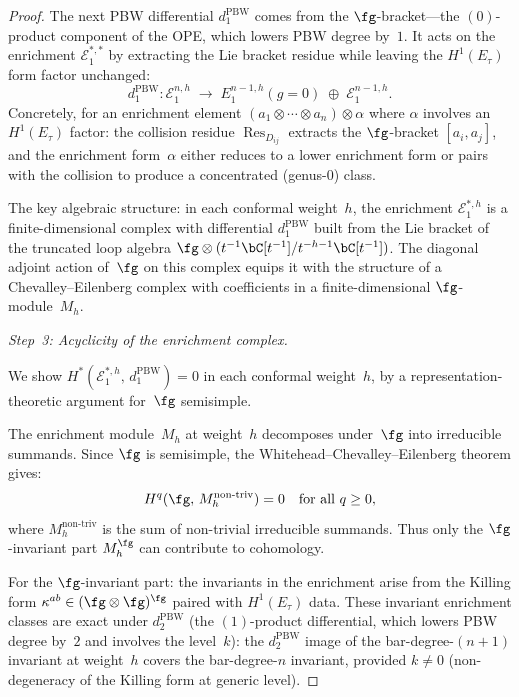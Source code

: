 \begin{proof}
The next PBW differential $d_1^{\mathrm{PBW}}$ comes
from the $\fg$-bracket---the $(0)$-product component
of the OPE, which lowers PBW degree by~$1$.  It acts
on the enrichment $\mathcal{E}^{*,*}_1$ by extracting
the Lie bracket residue while leaving the
$H^1(E_\tau)$ form factor unchanged:
\[
d_1^{\mathrm{PBW}}\colon \mathcal{E}_1^{n, h}
\;\longrightarrow\; E_1^{n-1,h}(g{=}0)
\;\oplus\; \mathcal{E}_1^{n-1, h}.
\]
Concretely, for an enrichment element
$(a_1 \otimes \cdots \otimes a_n) \otimes \alpha$
where $\alpha$ involves an $H^1(E_\tau)$ factor:
the collision residue $\operatorname{Res}_{D_{ij}}$
extracts the $\fg$-bracket $[a_i, a_j]$, and the
enrichment form~$\alpha$ either reduces to a lower
enrichment form or pairs with the collision to produce
a concentrated (genus-$0$) class.

The key algebraic structure: in each conformal
weight~$h$, the enrichment
$\mathcal{E}_1^{*,h}$ is a finite-dimensional complex
with differential $d_1^{\mathrm{PBW}}$ built from the
Lie bracket of the truncated loop algebra
$\fg \otimes (t^{-1}\bC[t^{-1}] / t^{-h-1}\bC[t^{-1}])$.
The diagonal adjoint action of~$\fg$ on this complex
equips it with the structure of a Chevalley--Eilenberg
complex with coefficients in a finite-dimensional
$\fg$-module~$M_h$.

\medskip
\emph{Step~3: Acyclicity of the enrichment complex.}

We show $H^*(\mathcal{E}_1^{*,h},\, d_1^{\mathrm{PBW}}) = 0$
in each conformal weight~$h$, by a representation-theoretic
argument for~$\fg$ semisimple.

The enrichment module~$M_h$ at weight~$h$ decomposes
under~$\fg$ into irreducible summands.  Since $\fg$ is
semisimple, the Whitehead--Chevalley--Eilenberg theorem
gives:
\[
H^q(\fg,\, M_h^{\mathrm{non\text{-}triv}}) = 0
\quad \text{for all } q \geq 0,
\]
where $M_h^{\mathrm{non\text{-}triv}}$ is the sum of
non-trivial irreducible summands.  Thus only the
$\fg$-invariant part $M_h^{\fg}$ can contribute
to cohomology.

For the $\fg$-invariant part: the invariants in the
enrichment arise from the Killing form
$\kappa^{ab} \in (\fg \otimes \fg)^{\fg}$ paired
with $H^1(E_\tau)$ data.  These invariant enrichment classes
are exact under $d_2^{\mathrm{PBW}}$
(the $(1)$-product differential, which lowers PBW
degree by~$2$ and involves the level~$k$): the
$d_2^{\mathrm{PBW}}$ image of the bar-degree-$(n{+}1)$
invariant at weight~$h$ covers the bar-degree-$n$
invariant, provided $k \neq 0$ (non-degeneracy of the
Killing form at generic level).


\end{proof}
